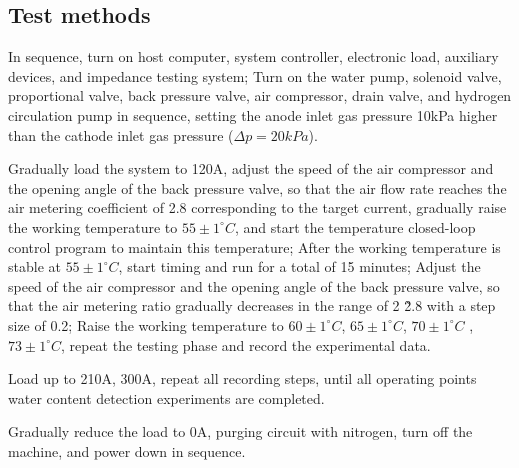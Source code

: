 \subsection*{Test methods}
In sequence, turn on host computer, system controller, electronic load, auxiliary devices, and impedance testing system; Turn on the water pump, solenoid valve, proportional valve, back pressure valve, air compressor, drain valve, and hydrogen circulation pump in sequence, setting the anode inlet gas pressure 10kPa higher than the cathode inlet gas pressure ($\Delta p=20kPa$).
\par
Gradually load the system to 120A, adjust the speed of the air compressor and the opening angle of the back pressure valve, so that the air flow rate reaches the air metering coefficient of 2.8 corresponding to the target current, gradually raise the working temperature to $55\pm1^{\circ}C$, and start the temperature closed-loop control program to maintain this temperature; After the working temperature is stable at $55\pm1^{\circ}C$, start timing and run for a total of 15 minutes; Adjust the speed of the air compressor and the opening angle of the back pressure valve, so that the air metering ratio gradually decreases in the range of 2 \~ 2.8 with a step size of 0.2; Raise the working temperature to $60\pm1^{\circ}C$, $65\pm1^{\circ}C$, $70\pm1^{\circ}C$ , $73\pm1^{\circ}C$, repeat the testing phase and record the experimental data.
\par
Load up to 210A, 300A, repeat all recording steps, until all operating points water content detection experiments are completed.
\par
Gradually reduce the load to 0A, purging circuit with nitrogen, turn off the machine, and power down in sequence.
